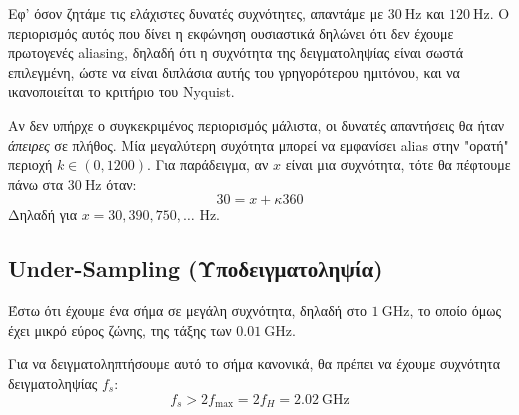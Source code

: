 \documentclass[11pt,a4paper,notitlepage,fleqn]{article}
\let\mytodo\todo
\renewcommand{\todo}[1]{\par\mytodo[inline,noline]{#1}}
\begin{document}
\begin{exercise}
	Εφ' όσον ζητάμε τις ελάχιστες δυνατές συχνότητες, απαντάμε με \( \SI{30}{\hertz} \) και \( \SI{120}{\hertz} \).
	Ο περιορισμός αυτός που δίνει η εκφώνηση ουσιαστικά δηλώνει ότι δεν έχουμε πρωτογενές aliasing, δηλαδή
	ότι η συχνότητα της δειγματοληψίας είναι σωστά επιλεγμένη, ώστε να είναι διπλάσια αυτής του
	γρηγορότερου ημιτόνου, και να ικανοποιείται το κριτήριο του Nyquist.
	
	Αν δεν υπήρχε ο συγκεκριμένος περιορισμός μάλιστα, οι δυνατές απαντήσεις θα ήταν \emph{άπειρες}
	σε πλήθος. Μία μεγαλύτερη συχότητα μπορεί να εμφανίσει alias στην "ορατή" περιοχή \( k \in (0,1200) \). Για παράδειγμα, αν \( x \) είναι μια συχνότητα, τότε θα πέφτουμε πάνω στα \( \SI{30}{\hertz} \)
	όταν:
	\[
	30 = x + κ360
	\]
	Δηλαδή για \( x=30,390,750,\dots \) Hz.
	
	\todo{solve in another way}
\end{exercise}


\subsection{Under-Sampling (Υποδειγματοληψία)}

\begin{center}
\end{center}

Έστω ότι έχουμε ένα σήμα σε μεγάλη συχνότητα, δηλαδή στο \( \SI{1}{\giga\hertz} \), το οποίο όμως έχει μικρό
εύρος ζώνης, της τάξης των \( \SI{0.01}{\giga\hertz} \).

Για να δειγματοληπτήσουμε αυτό το σήμα κανονικά, θα πρέπει να έχουμε συχνότητα δειγματοληψίας \( f_s \):
\[
f_s > 2 f_{\max} = 2f_H = \SI{2.02}{\giga\hertz}
\]
\end{document}
